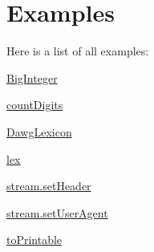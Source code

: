 \section{Examples}
Here is a list of all examples\+:\begin{DoxyCompactItemize}
\item 
\mbox{\hyperlink{BigInteger-example}{Big\+Integer}}
\item 
\mbox{\hyperlink{countDigits-example}{count\+Digits}}
\item 
\mbox{\hyperlink{DawgLexicon-example}{Dawg\+Lexicon}}
\item 
\mbox{\hyperlink{lex-example}{lex}}
\item 
\mbox{\hyperlink{stream_8setHeader-example}{stream.\+set\+Header}}
\item 
\mbox{\hyperlink{stream_8setUserAgent-example}{stream.\+set\+User\+Agent}}
\item 
\mbox{\hyperlink{toPrintable-example}{to\+Printable}}
\end{DoxyCompactItemize}
